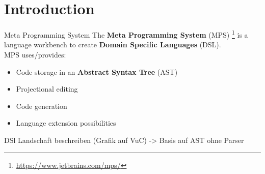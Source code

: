 



    \begin{frame}
        \setcounter{framenumber}{0}
        \titlepage
    \end{frame}

    \begin{frame}
        \frametitle{\contentsname}
        \tableofcontents[hideothersubsections]
    \end{frame}

    \section{Introduction}
    
    \begin{frame}{Meta Programming System}
    	The \textbf{Meta Programming System} (MPS) \footnote{\url{https://www.jetbrains.com/mps/}} is a language workbench to create \textbf{Domain Specific Languages} (DSL).\\
    	
    	MPS uses/provides:
    	\begin{itemize}
    		\item Code storage in an \textbf{Abstract Syntax Tree} (AST)
    		\item Projectional editing
    		\item Code generation
    		\item Language extension possibilities
    	\end{itemize}
    \end{frame}

	\begin{frame}
		DSl Landschaft beschreiben (Grafik auf VuC) -> Basis auf AST ohne Parser
	\end{frame}

